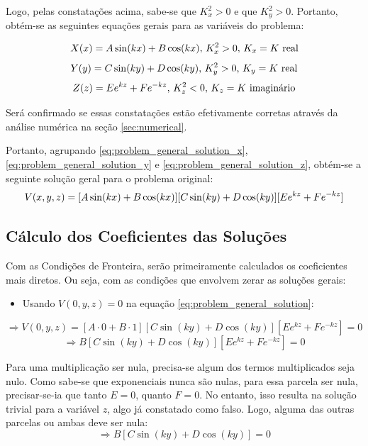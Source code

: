 \documentclass{report}
\begin{document}
Logo, pelas constatações acima, sabe-se que $ K_x^2 > 0 $ e que $ K_y^2 > 0 $. Portanto, obtém-se as seguintes equações gerais para as
variáveis do problema:

\begin{equation}
    \label{eq:problem_general_solution_x}
    \centering
    X(x) = A\sin(kx) + B\cos(kx),\, K_x^2 > 0,\, K_x = K \text{ real}
\end{equation}
\begin{equation}
    \label{eq:problem_general_solution_y}
    \centering
    Y(y) = C\sin(ky) + D\cos(ky),\, K_y^2 > 0,\, K_y = K \text{ real}
\end{equation}
\begin{equation}
    \label{eq:problem_general_solution_z}
    \centering
    Z(z) = Ee^{kz} + Fe^{-kz},\, K_z^2 < 0,\, K_z = K \text{ imaginário}
\end{equation}

Será confirmado se essas constatações estão efetivamente corretas através da
análise numérica na seção \ref{sec:numerical}.

Portanto, agrupando \ref{eq:problem_general_solution_x}, \ref{eq:problem_general_solution_y} e
\ref{eq:problem_general_solution_z}, obtém-se a seguinte solução geral para o problema original:
\begin{equation}
    \label{eq:problem_general_solution}
    \centering
    V(x, y, z) = [A\sin(kx) + B\cos(kx)][C\sin(ky) + D\cos(ky)][Ee^{kz} + Fe^{-kz}]
\end{equation}

\subsection{Cálculo dos Coeficientes das Soluções}

Com as Condições de Fronteira, serão primeiramente calculados os coeficientes mais diretos.
Ou seja, com as condições que envolvem zerar as soluções gerais:

\begin{itemize}
  \item Usando $ V(0, y, z) = 0 $ na equação \ref{eq:problem_general_solution}:
\end{itemize}
$$ \Rightarrow V(0, y, z) = [A \cdot 0 + B \cdot 1][C\sin(ky) + D\cos(ky)][Ee^{kz} + Fe^{-kz}] = 0 $$
$$ \Rightarrow B[C\sin(ky) + D\cos(ky)][Ee^{kz} + Fe^{-kz}] = 0 $$

Para uma multiplicação ser nula, precisa-se algum dos termos multiplicados seja nulo. Como sabe-se que
exponenciais nunca são nulas, para essa parcela ser nula, precisar-se-ia que tanto $ E = 0 $, quanto $ F = 0 $.
No entanto, isso resulta na solução trivial para a variável $ z $, algo já constatado como falso. Logo, alguma
das outras parcelas ou ambas deve ser nula:
$$ \Rightarrow B[C\sin(ky) + D\cos(ky)] = 0 $$
\end{document}
